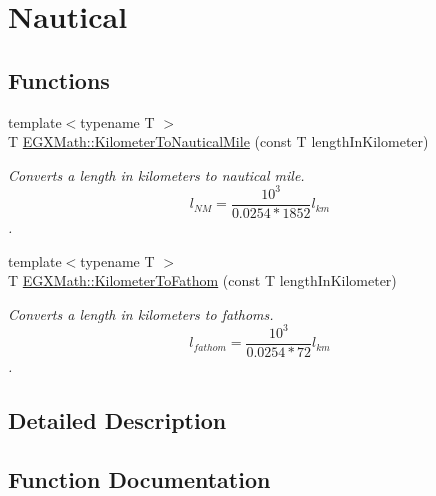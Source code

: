 \hypertarget{group___e_g_x_math-_conversions-_length_conversions-_kilometer-_nautical}{}\section{Nautical}
\label{group___e_g_x_math-_conversions-_length_conversions-_kilometer-_nautical}
\subsection*{Functions}
\begin{DoxyCompactItemize}
\item 
{\footnotesize template$<$typename T $>$ }\\T \mbox{\hyperlink{group___e_g_x_math-_conversions-_length_conversions-_kilometer-_nautical_ga4571f464f551ae965f88192b53dd24ff}{E\+G\+X\+Math\+::\+Kilometer\+To\+Nautical\+Mile}} (const T length\+In\+Kilometer)
\begin{DoxyCompactList}\small\item\em Converts a length in kilometers to nautical mile. \[ l_{NM}= \frac{10^{3}}{0.0254 * 1852} l_{km} \]. \end{DoxyCompactList}\item 
{\footnotesize template$<$typename T $>$ }\\T \mbox{\hyperlink{group___e_g_x_math-_conversions-_length_conversions-_kilometer-_nautical_gaaecd42afaeaadc41e885dbf49bebae83}{E\+G\+X\+Math\+::\+Kilometer\+To\+Fathom}} (const T length\+In\+Kilometer)
\begin{DoxyCompactList}\small\item\em Converts a length in kilometers to fathoms. \[ l_{fathom}= \frac{10^{3}}{0.0254 * 72} l_{km} \]. \end{DoxyCompactList}\end{DoxyCompactItemize}


\subsection{Detailed Description}


\subsection{Function Documentation}
\mbox{\label{group___e_g_x_math-_conversions-_length_conversions-_kilometer-_nautical_gaaecd42afaeaadc41e885dbf49bebae83}} 
